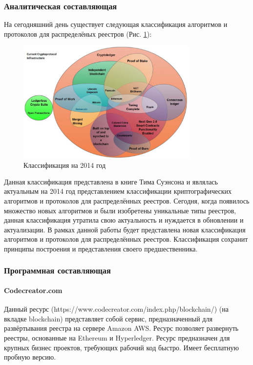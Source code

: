 \subsubsection{Аналитическая составляющая}
На сегодняшний день существует следующая классификация алгоритмов и протоколов
для распределёных реестров (Рис. \ref{2014protocol}):

\begin{figure}[h!]
    \centering
    \includegraphics[width=0.8\textwidth]{./images/current_protocols}
    \caption{Классификация на 2014 год \cite{TimSwanson2014}}\label{2014protocol}
\end{figure}

Данная классификация представлена в книге Тима Суэнсона \cite{TimSwanson2014} и
являлась актуальным на 2014 год представлением классификации криптографических
алгоритмов и протоколов для распределённых реестров. Сегодня, когда появилось
множество новых алгоритмов и были изобретены уникальные типы реестров, данная
классификация утратила свою актуальность и нуждается в обновлении и
актуализации. В рамках данной работы будет представлена новая классификация
алгоритмов и протоколов для распределённых реестров. Классификация сохранит
принципы построения и представления своего предшественника.

\subsubsection{Программная составляющая}
\paragraph{Codecreator.com}
Данный ресурс (https://www.codecreator.com/index.php/blockchain/) (на вкладке
blockchain) представляет собой сервис, предназначенный для развёртывания
реестра на сервере Amazon AWS. Ресурс позволяет развернуть реестры, основанные
на Ethereum и Hyperledger. Ресурс предназначен для крупных бизнес проектов,
требующих рабочий код быстро. Имеет бесплатную пробную версию.

